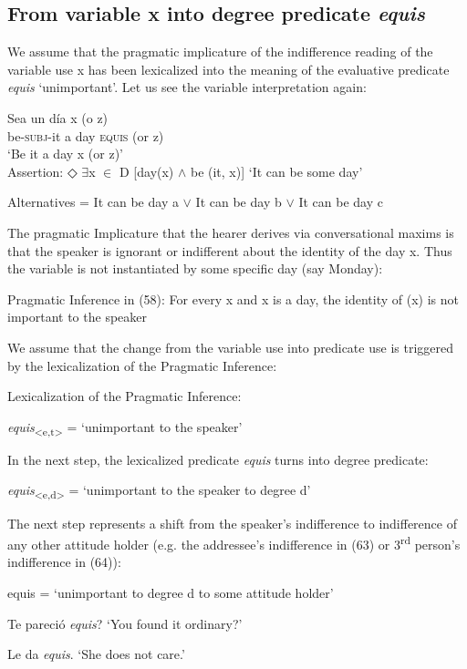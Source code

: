 \documentclass[output=paper
,modfonts
,nonflat]{langsci/langscibook}
\begin{document}
\subsection{From variable x into degree predicate \textit{equis}}\label{sec:kellert:4.1}
We assume that the pragmatic implicature of the indifference reading of the variable use x has been lexicalized into the meaning of the evaluative predicate \textit{equis} ‘unimportant’.  Let us see the variable interpretation again:

\ea
\gll Sea un día x (o z)\\
 be-\textsc{subj}-it a day \textsc{equis} (or z)\\	
\glt ‘Be it a day x (or z)’\\  
Assertion: ◇ $\exists$x $\in$ D {[}day(x) $\wedge$ be (it, x){]} ‘It can be some day’\par
Alternatives = It can be day a $\vee$ It can be day b $\vee$ It can be day c
\z

The pragmatic Implicature that the hearer derives via conversational maxims is that the speaker is ignorant or indifferent about the identity of the day x. Thus the variable is not instantiated by some specific day (say Monday):

\ea Pragmatic Inference in (58): For every x and x is a day, the identity of (x) is not important to the speaker
\z

We assume that the change from the variable use into predicate use is triggered by the lexicalization of the Pragmatic Inference:

\ea Lexicalization of the Pragmatic Inference:\par
	\textit{equis}\textsubscript{<e,t>} = ‘unimportant to the speaker’ 
\z

In the next step, the lexicalized predicate \textit{equis} turns into degree predicate:

\ea \textit{equis}\textsubscript{<e,d>} = ‘unimportant to the speaker to degree d’
\z

The next step represents a shift from the speaker’s indifference to  indifference of any other attitude holder (e.g. the addressee’s indifference in (63) or 3\textsuperscript{rd} person’s indifference in (64)):

\ea	equis = ‘unimportant to degree d to some attitude holder’ 
\z

\ea Te pareció \textit{equis}? ‘You found it ordinary?’
\z

\ea Le da \textit{equis}. ‘She does not care.’
\z
\end{document}
